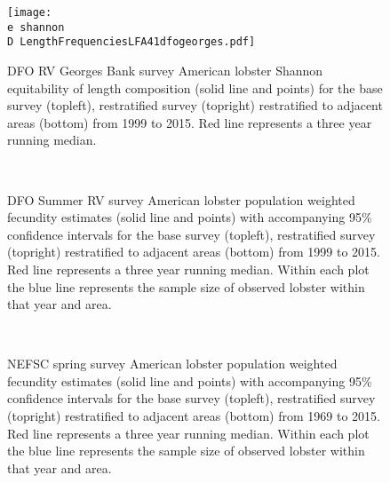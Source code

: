 \documentclass[11pt]{article}
\newcommand{\D}{.}
\newcommand{\e}{/backup/bio_data/bio.lobster/figures/} %
\begin{document}
\begin{figure}

    \texttt{[image: \\e shannon\\D LengthFrequenciesLFA41dfogeorges.pdf]}
    \caption{DFO RV Georges Bank survey American lobster Shannon equitability of length composition (solid line and points) for the base survey (topleft), restratified survey (topright) restratified to adjacent areas (bottom) from 1999 to 2015. Red line represents a three year running median.}

\end{figure}






\begin{figure}
\centering
{}
\\
\caption{DFO Summer RV survey American lobster population weighted fecundity estimates (solid line and points) with accompanying 95\% confidence intervals for the base survey (topleft), restratified survey (topright) restratified to adjacent areas (bottom) from 1999 to 2015. Red line represents a three year running median. Within each plot the blue line represents the sample size of observed lobster within that year and area.}
\end{figure}
\clearpage


\begin{figure}
\centering
{}
\\
\caption{NEFSC spring survey American lobster population weighted fecundity estimates (solid line and points) with accompanying 95\% confidence intervals for the base survey (topleft), restratified survey (topright) restratified to adjacent areas (bottom) from 1969 to 2015. Red line represents a three year running median. Within each plot the blue line represents the sample size of observed lobster within that year and area. }
\end{figure}
\clearpage
\end{document}
